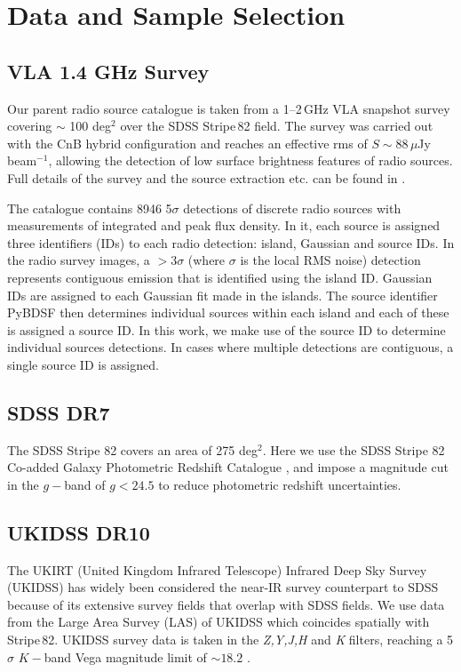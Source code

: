 \section{Data and Sample Selection}\label{section-2}

\subsection{VLA 1.4 GHz Survey}
Our parent radio source catalogue is taken from a 1--2\,GHz VLA snapshot survey covering $\sim$ 100 deg$^{2}$ over the SDSS Stripe\,82 field. The survey was carried out with the CnB hybrid configuration and reaches an effective rms of $S \sim 88$\,$\mu$Jy beam$^{-1}$, allowing the detection of low surface brightness features of radio sources. Full details of the survey and the source extraction etc. can be found in \citet{heywood2016}. 

The catalogue contains 8946 5$\sigma$ detections of discrete radio sources with measurements of integrated and peak flux density. In it, each source is assigned three identifiers (IDs) to each radio detection: island, Gaussian and source IDs. In the radio survey images, a $>3\sigma$ (where $\sigma$ is the local RMS noise) detection represents contiguous emission that is identified using the island ID. Gaussian IDs are assigned to each Gaussian fit made in the islands. The source identifier PyBDSF \citep{mohan2015} then determines individual sources within each island and each of these is assigned a source ID. In this work, we make use of the source ID to determine individual sources detections. In cases where multiple detections are contiguous, a single source ID is assigned.

\subsection{SDSS DR7}\label{section-sdss}
The SDSS Stripe 82 covers an area of 275 deg$^{2}$. Here we use the SDSS Stripe 82 Co-added Galaxy Photometric Redshift Catalogue \citep{reis2012}, and impose a magnitude cut in the $g-$band of $g < 24.5$ to reduce photometric redshift uncertainties.

\subsection{UKIDSS DR10} 
The UKIRT (United Kingdom Infrared Telescope) Infrared Deep Sky Survey (UKIDSS) has widely been considered the near-IR survey counterpart to SDSS because of its extensive survey fields that overlap with SDSS fields. We use data from the Large Area Survey (LAS) of UKIDSS which coincides spatially with Stripe\,82. UKIDSS survey data is taken in the \textit{Z,Y,J,H} and \textit{K} filters, reaching a 5$\sigma$ $K-$band Vega magnitude limit of $\sim18.2$ \citep{lawrence2007}. 

